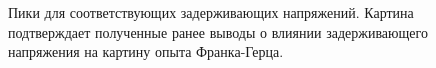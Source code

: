 \documentclass[a4paper, 14pt]{extarticle}%
\begin{document}
\begin{figure}[h]
\begin{minipage}[h]{0.5\linewidth}
\end{minipage}
\hfill
\begin{minipage}[h]{0.5\linewidth}
\end{minipage}
\caption{Пики для соответствующих задерживающих напряжений. Картина  подтверждает полученные ранее выводы о влиянии задерживающего напряжения на картину опыта Франка-Герца.}
\label{ris:image1}
\end{figure}
\end{document}
